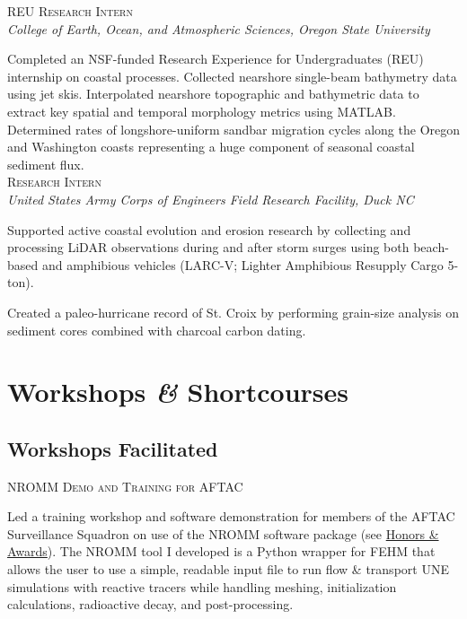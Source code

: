 \documentclass[11pt, letterpaper]{article}
\newcommand{\amper}{{\fontspec[Scale=.95]{Adobe Caslon Pro}\selectfont\itshape\&}}
\newcommand{\years}[1]{\marginnote{\scriptsize #1}}
\begin{document}
\noindent
\years{2013}\textsc{REU Research Intern}\\
\textit{College of Earth, Ocean, and Atmospheric Sciences, Oregon State University}

    \vspace{3pt} \noindent  
    Completed an NSF-funded Research Experience for Undergraduates (REU)
    internship on coastal processes. Collected nearshore single-beam bathymetry
    data using jet skis. Interpolated nearshore topographic and bathymetric
    data to extract key spatial and temporal morphology metrics using MATLAB.
    Determined rates of longshore-uniform sandbar migration cycles along the
    Oregon and Washington coasts representing a huge component of seasonal
    coastal sediment flux.\\

\noindent
\years{2013}\textsc{Research Intern}\\
\textit{United States Army Corps of Engineers Field Research Facility, Duck NC}

    \vspace{3pt} \noindent  
    Supported active coastal evolution and erosion research by collecting and
    processing LiDAR observations during and after storm surges using both
    beach-based and amphibious vehicles (LARC-V; Lighter Amphibious Resupply
    Cargo 5-ton).

	Created a paleo-hurricane record of St. Croix by performing grain-size
	analysis on sediment cores combined with charcoal carbon dating.

\setlength{\parindent}{0pt}  %

\section*{Workshops \amper{} Shortcourses}

\subsection*{Workshops Facilitated}
\label{sec:workshopsFacilitated}
\noindent
\years{2021}\textsc{NROMM Demo and Training for AFTAC}%

    Led a training workshop and software demonstration for members of the AFTAC
     Surveillance Squadron on use of the NROMM software package (see
    \hyperref[sec:awards]{Honors \& Awards}).  The NROMM tool I developed is a
    Python wrapper for FEHM that allows the user to use a simple, readable
    input file to run flow \& transport UNE simulations with reactive tracers
    while handling meshing, initialization calculations, radioactive decay, and
    post-processing.
\end{document}
